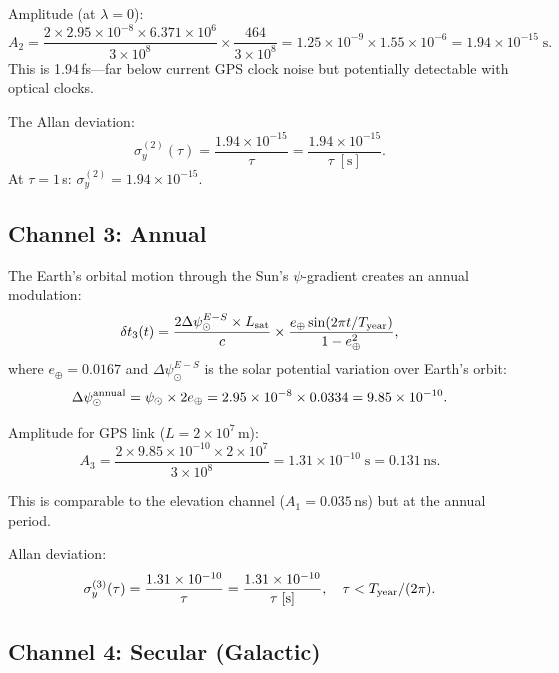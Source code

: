 \documentclass[aps,prd,twocolumn,superscriptaddress]{revtex4-2}
\newcommand{\ns}{\,\mathrm{ns}}
\begin{document}
Amplitude (at $\lambda = 0$):
\begin{equation}
A_2 = \frac{2\times2.95\times10^{-8}\times6.371\times10^6}{3\times10^8}
\times\frac{464}{3\times10^8}
= 1.25\times10^{-9}\times1.55\times10^{-6}
= 1.94\times10^{-15}\;\text{s}.
\end{equation}
This is 1.94\,fs---far below current GPS clock noise but potentially
detectable with optical clocks.

The Allan deviation:
\begin{equation}
\sigma_y^{(2)}(\tau) = \frac{1.94\times10^{-15}}{\tau}
= \frac{1.94\times10^{-15}}{\tau\;[\text{s}]}.
\end{equation}
At $\tau = 1$\,s: $\sigma_y^{(2)} = 1.94\times10^{-15}$.

\subsection{Channel 3: Annual}

The Earth's orbital motion through the Sun's $\psi$-gradient
creates an annual modulation:
\begin{equation}
\delta t_3(t) = \frac{2\Delta\psi_\odot^{E-S}\times L_{\rm sat}}{c}
\times\frac{e_\oplus\sin(2\pi t/T_{\rm year})}{1-e_\oplus^2},
\end{equation}
where $e_\oplus = 0.0167$ and $\Delta\psi_\odot^{E-S}$ is the
solar potential variation over Earth's orbit:
\begin{equation}
\Delta\psi_\odot^{\rm annual} = \psi_\odot\times 2e_\oplus
= 2.95\times10^{-8}\times0.0334 = 9.85\times10^{-10}.
\end{equation}

Amplitude for GPS link ($L = 2\times10^7$\,m):
\begin{equation}
A_3 = \frac{2\times9.85\times10^{-10}\times2\times10^7}{3\times10^8}
= 1.31\times10^{-10}\;\text{s} = 0.131\ns.
\end{equation}

This is comparable to the elevation channel ($A_1 = 0.035$\,ns)
but at the annual period.

Allan deviation:
\begin{equation}
\sigma_y^{(3)}(\tau) = \frac{1.31\times10^{-10}}{\tau}
= \frac{1.31\times10^{-10}}{\tau\;[\text{s}]},
\quad \tau < T_{\rm year}/(2\pi).
\end{equation}

\subsection{Channel 4: Secular (Galactic)}
\end{document}
